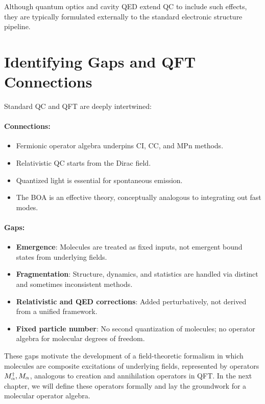 Although quantum optics and cavity QED extend QC to include such effects, they are typically formulated externally to the standard electronic structure pipeline.

\section{Identifying Gaps and QFT Connections}
\label{sec:qc_gaps_connections}

Standard QC and QFT are deeply intertwined:

\paragraph{Connections:}
\begin{itemize}
	\item Fermionic operator algebra underpins CI, CC, and MPn methods.
	\item Relativistic QC starts from the Dirac field.
	\item Quantized light is essential for spontaneous emission.
	\item The BOA is an effective theory, conceptually analogous to integrating out fast modes.
\end{itemize}

\paragraph{Gaps:}
\begin{itemize}
	\item \textbf{Emergence}: Molecules are treated as fixed inputs, not emergent bound states from underlying fields.
	\item \textbf{Fragmentation}: Structure, dynamics, and statistics are handled via distinct and sometimes inconsistent methods.
	\item \textbf{Relativistic and QED corrections}: Added perturbatively, not derived from a unified framework.
	\item \textbf{Fixed particle number}: No second quantization of molecules; no operator algebra for molecular degrees of freedom.
\end{itemize}

\medskip

These gaps motivate the development of a field-theoretic formalism in which molecules are composite excitations of underlying fields, represented by operators \(M^\dagger_{\alpha}, M_{\alpha}\), analogous to creation and annihilation operators in QFT. In the next chapter, we will define these operators formally and lay the groundwork for a molecular operator algebra.

